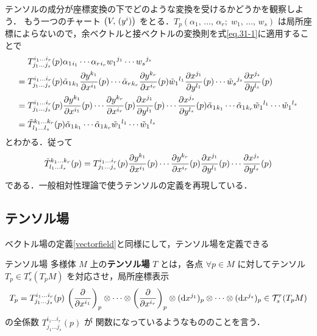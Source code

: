\documentclass[geometry_main]{subfiles}
\begin{document}
テンソルの成分が座標変換の下でどのような変換を受けるかどうかを観察しよう．
もう一つのチャート $\bigl(V,\, (y^i)\bigr)$ をとる．$T_p \left( \alpha_1,\, \dots ,\, \alpha_r ;\; w_1,\, \dots ,\, w_s \right)$ は局所座標によらないので，余ベクトルと接ベクトルの変換則を式\eqref{eq.31-1}に適用することで
\begin{align} 
	&T^{i_1 \dots i_r}_{j_1 \dots j_s}(p) \alpha_1{}_{i_1} \cdots \alpha_r{}_{i_r}  w_1{}^{j_1} \cdots w_s{}^{j_s} \\
	=\; &T^{i_1 \dots i_r}_{j_1 \dots j_s}(p) \tilde{\alpha}_1{}_{k_1} \pdv{y^{k_1}}{x^{i_1}}()(p) \cdots \tilde{\alpha}_r{}_{k_r}\pdv{y^{k_r}}{x^{i_r}}()(p)  \tilde{w}_1{}^{l_1} \pdv{x^{j_1}}{y^{l_1}}()(p) \cdots \tilde{w}_s{}^{j_s} \pdv{x^{j_s}}{y^{l_s}}()(p) \\
	=\; &T^{i_1 \dots i_r}_{j_1 \dots j_s}(p) \pdv{y^{k_1}}{x^{i_1}}()(p) \cdots \pdv{y^{k_r}}{x^{i_r}}()(p)  \pdv{x^{j_1}}{y^{l_1}}()(p)  \cdots \pdv{x^{j_s}}{y^{l_s}}()(p) \tilde{\alpha}_1{}_{k_1} \cdots \tilde{\alpha}_1{}_{k_r} \tilde{w}_1{}^{l_1} \cdots \tilde{w}_1{}^{l_s} \\
	=\; &\tilde{T}^{k_1 \dots k_r}_{l_1 \dots l_s}(p) \tilde{\alpha}_1{}_{k_1} \cdots \tilde{\alpha}_1{}_{k_r} \tilde{w}_1{}^{l_1} \cdots \tilde{w}_1{}^{l_s} 
\end{align}
とわかる．従って
\begin{align} 
	\tilde{T}^{k_1 \dots k_r}_{l_1 \dots l_s}(p) = T^{i_1 \dots i_r}_{j_1 \dots j_s}(p) \pdv{y^{k_1}}{x^{i_1}}()(p) \cdots \pdv{y^{k_r}}{x^{i_r}}()(p)  \pdv{x^{j_1}}{y^{l_1}}()(p)  \cdots \pdv{x^{j_s}}{y^{l_s}}()(p)
\end{align}
である．一般相対性理論で使うテンソルの定義を再現している．

\subsection{テンソル場}

ベクトル場の定義\ref{vectorfield}と同様にして，テンソル場を定義できる
\begin{mydef}[label=tensorfield]{テンソル場} 
	\cinfty 多様体 $M$ 上の\textbf{テンソル場} $T$ とは，各点 $\forall p \in M$ に対してテンソル $T_p \in T^r_s(T_pM)$ を対応させ，局所座標表示
	\begin{align} 
		T_p =  T^{i_1 \dots i_r}_{j_1 \dots j_s} (p) \, \left(\pdv{}{x^{i_1}}\right)_p \otimes \cdots \otimes \left(\pdv{}{x^{i_r}}\right)_p \otimes (\dd{x^{j_1}})_p \otimes \cdots \otimes (\dd{x^{j_s}})_p \in \mathcal{T}^r_s(T_pM)
	\end{align}
	の全係数 $T^{i_1 \dots i_r}_{j_1 \dots j_s} (p)$ が \cinfty 関数になっているようなもののことを言う．
\end{mydef}
\end{document}
